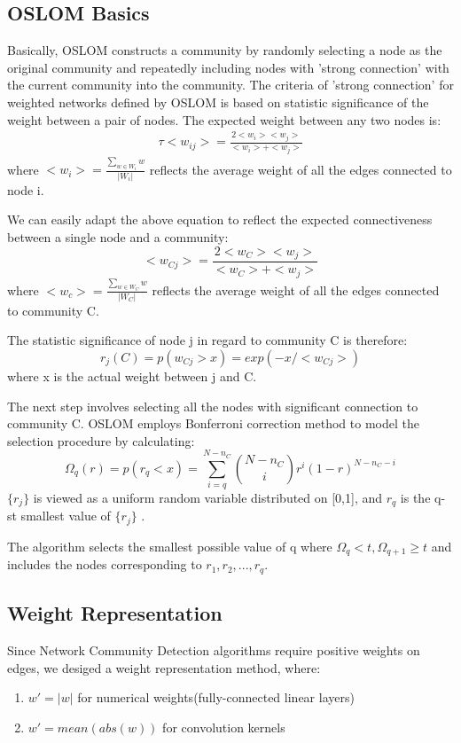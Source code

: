 \documentclass{acmtog} %
\begin{document}
\subsection*{OSLOM Basics}
Basically, OSLOM constructs a community by randomly selecting a node as the original community and repeatedly including nodes with 'strong connection' with the current community into the community.
The criteria of 'strong connection' for weighted networks defined by OSLOM is based on statistic significance of the weight between a pair of nodes. The expected weight between any two nodes is:
\begin{eqnarray}
  \tau	<w_{ij}>=\frac{2<w_{i}><w_{j}>}{<w_{i}>+<w_{j}>}
  \label{eq:Link_n_Stark}
\end{eqnarray}
where $<w_{i}>=\frac{\sum_{w\in W_{i}}w}{|W_{i}|}$ reflects the average weight of all the edges connected to node i.

We can easily adapt the above equation to reflect the expected connectiveness between a single node and a community:
\begin{equation}
\label{eq:moon}
 <w_{Cj}>=\frac{2<w_{C}><w_{j}>}{<w_{C}>+<w_{j}>}
\end{equation}
where $<w_{c}>=\frac{\sum_{w\in W_{C}}w}{|W_{C}|}$ reflects the average weight of all the edges connected to community C.

The statistic significance of node j in regard to community C is therefore:
\begin{equation}
 r_{j}(C )=p(w_{Cj}>x)=exp(-x/<w_{Cj}>)
\end{equation}
where x is the actual weight between j and C.

The next step involves selecting all the nodes with significant connection to community C. OSLOM employs Bonferroni correction method to model the selection procedure by calculating:
\begin{equation}
	\Omega_{q}(r)=p(r_{q}<x)=\sum_{i=q}^{N-n_{C}}\binom{N-n_{C}}{i}r^i(1-r)^{N-n_{C}-i}
\end{equation}
$\{r_{j}\}$ is viewed as a uniform random variable distributed on [0,1], and $r_{q}$ is the q-st smallest value of $\{r_{j}\}$ .

The algorithm selects the smallest possible value of q where $\Omega_{q}<t, \Omega_{q+1}\geq t$ and includes the nodes corresponding to $r_{1}, r_{2},..., r_{q}$.
\subsection*{Weight Representation}
%
Since Network Community Detection algorithms require positive weights on edges, we desiged a weight representation method, where:
\begin{enumerate}
	\item $w'=|w|$ for numerical weights(fully-connected linear layers)\\
    \item $w'=mean(abs(w))$ for convolution kernels
\end{enumerate}
\end{document}
